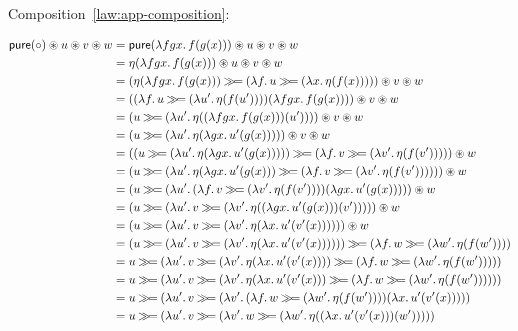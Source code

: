\pagebreak[4]

Composition~\eqref{law:app-composition}:

\setcounter{TemporaryCounter}{\value{equation}}
\setcounter{equation}{0}
\NoChapterPrefix
\begin{align}
  \pure(\compop) \circledast u \circledast v \circledast w
  &= \pure(\lam{f g x}{f(g(x))}) \circledast u \circledast v \circledast w \\
  &= \eta(\lam{f g x}{f(g(x))}) \circledast u \circledast v \circledast w \\
  &= (\eta(\lam{f g x}{f(g(x))}) \hsbind (\lam{f}{u \hsbind (\lam{x}{\eta(f(x))})})) \circledast v \circledast w \\
  &= ((\lam{f}{u \hsbind (\lam{u'}{\eta(f(u'))})})(\lam{f g x}{f(g(x))})) \circledast v \circledast w \\
  &= (u \hsbind (\lam{u'}{\eta((\lam{f g x}{f(g(x))})(u'))})) \circledast v \circledast w \\
  &= (u \hsbind (\lam{u'}{\eta(\lam{g x}{u'(g(x))})})) \circledast v \circledast w \\
  &= ((u \hsbind (\lam{u'}{\eta(\lam{g x}{u'(g(x))})})) \hsbind (\lam{f}{v \hsbind (\lam{v'}{\eta(f(v'))})})) \circledast w \\
  &= (u \hsbind (\lam{u'}{\eta(\lam{g x}{u'(g(x))}) \hsbind (\lam{f}{v \hsbind (\lam{v'}{\eta(f(v'))})})})) \circledast w \\
  &= (u \hsbind (\lam{u'}{(\lam{f}{v \hsbind (\lam{v'}{\eta(f(v'))})})(\lam{g x}{u'(g(x))})})) \circledast w \\
  &= (u \hsbind (\lam{u'}{v \hsbind (\lam{v'}{\eta((\lam{g x}{u'(g(x))})(v'))})})) \circledast w \\
  &= (u \hsbind (\lam{u'}{v \hsbind (\lam{v'}{\eta(\lam{x}{u'(v'(x))})})})) \circledast w \\
  &= (u \hsbind (\lam{u'}{v \hsbind (\lam{v'}{\eta(\lam{x}{u'(v'(x))})})})) \hsbind (\lam{f}{w \hsbind (\lam{w'}{\eta(f(w'))})}) \\
  &= u \hsbind (\lam{u'}{v \hsbind (\lam{v'}{\eta(\lam{x}{u'(v'(x))})}) \hsbind (\lam{f}{w \hsbind (\lam{w'}{\eta(f(w'))})})}) \\
  &= u \hsbind (\lam{u'}{v \hsbind (\lam{v'}{\eta(\lam{x}{u'(v'(x))}) \hsbind (\lam{f}{w \hsbind (\lam{w'}{\eta(f(w'))})})})}) \\
  &= u \hsbind (\lam{u'}{v \hsbind (\lam{v'}{(\lam{f}{w \hsbind (\lam{w'}{\eta(f(w'))})})(\lam{x}{u'(v'(x))})})}) \\
  &= u \hsbind (\lam{u'}{v \hsbind (\lam{v'}{w \hsbind (\lam{w'}{\eta((\lam{x}{u'(v'(x))})(w'))})})}) \\

\end{align}

